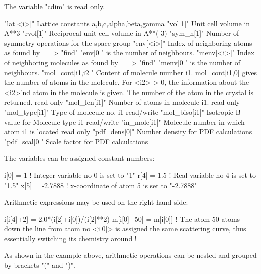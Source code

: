             The variable "cdim" is read only. 
\begin{MacVerbatim}
"lat[<i>]"  Lattice constants a,b,c,alpha,beta,gamma
"vol[1]"    Unit cell volume in A**3
"rvol[1]"   Reciprocal unit cell volume in A**(-3)
"sym_n[1]"  Number of symmetry operations for the space group
"env[<i>]"      Index of neighboring atoms as found by
                ==> "find"
                "env[0]" is the number of neighbours.
"menv[<i>]"      Index of neighboring molecules as found by
                ==> "find"
                "menv[0]" is the number of neighbours.
"mol_cont[i1,i2]" Content of molecule number i1.
                mol_cont[i1,0] gives the number of
                atoms in the molecule. For <i2> > 0, the
                information about the <i2>'nd atom in the
                molecule is given. The number of the
                atom in the crystal is returned.
                read only
"mol_len[i1]"   Number of atoms in molecule i1.
                read only
"mol_type[i1]"  Type of molecule no. i1
                read/write
"mol_biso[i1]"  Isotropic B-value for Molecule type i1
                read/write
"in_mole[i1]"   Molecule number in which atom i1 is located
                read only
"pdf_dens[0]"   Number density for PDF calculations
"pdf_scal[0]"   Scale factor   for PDF calculations
\end{MacVerbatim}
The variables can be assigned constant numbers: 
\par
\begin{MacVerbatim}
i[0] =  1               ! Integer variable no 0 is set to "1"
r[4] =  1.5             ! Real variable no 4 is set to "1.5"
x[5] = -2.7888          ! x-coordinate of atom 5 is set to "-2.7888"
\end{MacVerbatim}
Arithmetic expressions may be used on the right hand side: 
\par
\begin{MacVerbatim}
i[i[4]+2] = 2.0*(i[2]+i[0])/(i[2]**2)
m[i[0]+50] = m[i[0]] ! The atom 50 atoms down the line from
                       atom no <i[0]> is assigned the same
                       scattering curve, thus essentially switching
                       its chemistry around !
\end{MacVerbatim}
As shown in the example above, arithmetic operations can be nested 
and grouped by brackets "(" and ")". 
